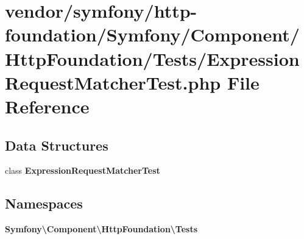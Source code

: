\section{vendor/symfony/http-\/foundation/\+Symfony/\+Component/\+Http\+Foundation/\+Tests/\+Expression\+Request\+Matcher\+Test.php File Reference}
\label{_expression_request_matcher_test_8php}
\subsection*{Data Structures}
\begin{DoxyCompactItemize}
\item 
class {\bf Expression\+Request\+Matcher\+Test}
\end{DoxyCompactItemize}
\subsection*{Namespaces}
\begin{DoxyCompactItemize}
\item 
 {\bf Symfony\textbackslash{}\+Component\textbackslash{}\+Http\+Foundation\textbackslash{}\+Tests}
\end{DoxyCompactItemize}
